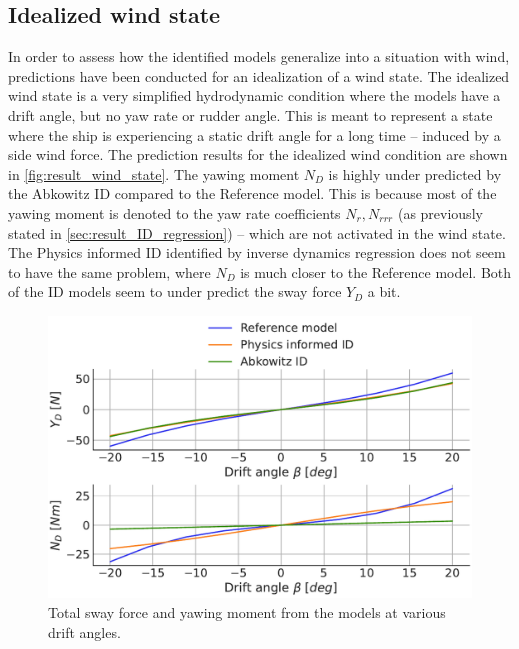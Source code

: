 \subsection{Idealized wind state}
In order to assess how the identified models generalize into a situation with wind, predictions have been conducted for an idealization of a wind state. The idealized wind state is a very simplified hydrodynamic condition where the models have a drift angle, but no yaw rate or rudder angle. This is meant to represent a state where the ship is experiencing a static drift angle for a long time -- induced by a side wind force.
The prediction results for the idealized wind condition are shown in \autoref{fig:result_wind_state}. The yawing moment $N_D$ is highly under predicted by the Abkowitz ID compared to the Reference model. This is because most of the yawing moment is denoted to the yaw rate coefficients $N_r,N_{rrr}$ (as previously stated in \autoref{sec:result_ID_regression}) -- which are not activated in the wind state. The Physics informed ID identified by inverse dynamics regression does not seem to have the same problem, where $N_D$ is much closer to the Reference model. Both of the ID models seem to under predict the sway force $Y_D$ a bit.
\label{sec:wind_state}
\begin{figure}[h!]
    \includegraphics[width=\columnwidth]{figures/result_wind_state.forces.pdf}
    \caption{Total sway force and yawing moment from the models at various drift angles.}
    \label{fig:result_wind_state}
\end{figure}